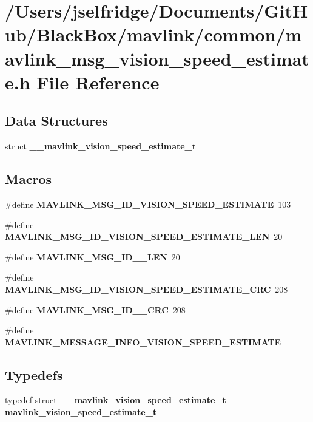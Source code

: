 \section{/\+Users/jselfridge/\+Documents/\+Git\+Hub/\+Black\+Box/mavlink/common/mavlink\+\_\+msg\+\_\+vision\+\_\+speed\+\_\+estimate.h File Reference}
\label{mavlink__msg__vision__speed__estimate_8h}
\subsection*{Data Structures}
\begin{DoxyCompactItemize}
\item 
struct \textbf{ \+\_\+\+\_\+mavlink\+\_\+vision\+\_\+speed\+\_\+estimate\+\_\+t}
\end{DoxyCompactItemize}
\subsection*{Macros}
\begin{DoxyCompactItemize}
\item 
\#define \textbf{ M\+A\+V\+L\+I\+N\+K\+\_\+\+M\+S\+G\+\_\+\+I\+D\+\_\+\+V\+I\+S\+I\+O\+N\+\_\+\+S\+P\+E\+E\+D\+\_\+\+E\+S\+T\+I\+M\+A\+TE}~103
\item 
\#define \textbf{ M\+A\+V\+L\+I\+N\+K\+\_\+\+M\+S\+G\+\_\+\+I\+D\+\_\+\+V\+I\+S\+I\+O\+N\+\_\+\+S\+P\+E\+E\+D\+\_\+\+E\+S\+T\+I\+M\+A\+T\+E\+\_\+\+L\+EN}~20
\item 
\#define \textbf{ M\+A\+V\+L\+I\+N\+K\+\_\+\+M\+S\+G\+\_\+\+I\+D\+\_\+\_\+\+L\+EN}~20
\item 
\#define \textbf{ M\+A\+V\+L\+I\+N\+K\+\_\+\+M\+S\+G\+\_\+\+I\+D\+\_\+\+V\+I\+S\+I\+O\+N\+\_\+\+S\+P\+E\+E\+D\+\_\+\+E\+S\+T\+I\+M\+A\+T\+E\+\_\+\+C\+RC}~208
\item 
\#define \textbf{ M\+A\+V\+L\+I\+N\+K\+\_\+\+M\+S\+G\+\_\+\+I\+D\+\_\+\_\+\+C\+RC}~208
\item 
\#define \textbf{ M\+A\+V\+L\+I\+N\+K\+\_\+\+M\+E\+S\+S\+A\+G\+E\+\_\+\+I\+N\+F\+O\+\_\+\+V\+I\+S\+I\+O\+N\+\_\+\+S\+P\+E\+E\+D\+\_\+\+E\+S\+T\+I\+M\+A\+TE}
\end{DoxyCompactItemize}
\subsection*{Typedefs}
\begin{DoxyCompactItemize}
\item 
typedef struct \textbf{ \+\_\+\+\_\+mavlink\+\_\+vision\+\_\+speed\+\_\+estimate\+\_\+t} \textbf{ mavlink\+\_\+vision\+\_\+speed\+\_\+estimate\+\_\+t}
\end{DoxyCompactItemize}



